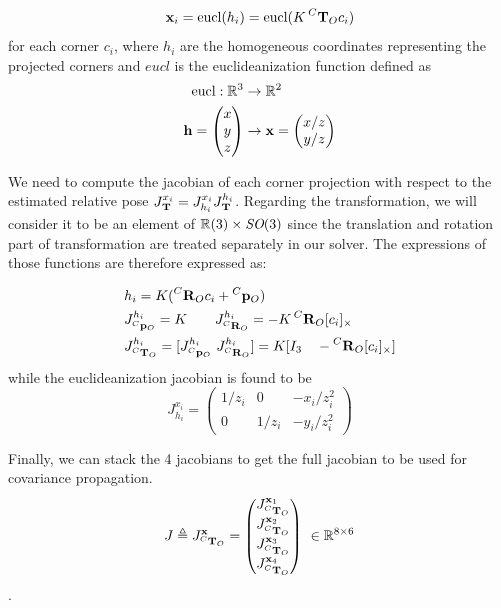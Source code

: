 \begin{equation}
    {\bf x}_i = \text{eucl}(h_i) = \text{eucl}(K\prescript{C}{}{{\bf T}}_{O} c_i)
\end{equation}
for each corner $c_i$, where $h_i$ are the homogeneous coordinates representing the projected corners and $eucl$ is the euclideanization function defined as
\begin{equation}
    \begin{split}
        \text{eucl}: \mathbb{R}^3 &\rightarrow \mathbb{R}^2 \\
        {\bf h} = \begin{pmatrix}x\\y\\z\end{pmatrix} &\rightarrow {\bf x} = \begin{pmatrix}x/z\\y/z\end{pmatrix}
    \end{split}
\end{equation}

We need to compute the jacobian of each corner projection with respect to the estimated relative pose $J^{x_i}_{\prescript{}{}{{\bf T}}_{}} = J^{x_i}_{h_i} J^{h_i}_{\prescript{}{}{{\bf T}}_{}}$. 
Regarding the transformation, we will consider it to be an element of $\mathbb{R}(3)\times \textit{SO}(3)$ since the translation and rotation part 
of transformation are treated separately in our solver. The expressions of those functions are therefore expressed as:

\begin{equation}
    \begin{split}
        &h_i = K(\prescript{C}{}{{\bf R}}_{O}c_i + \prescript{C}{}{{\bf p}}_{O}) \\
        &J^{h_i}_{\prescript{C}{}{{\bf p}}_{O}} = K ~~~~~~ J^{h_i}_{\prescript{C}{}{{\bf R}}_{O}} = -K\prescript{C}{}{{\bf R}}_{O}[c_i]_{\times}  \\  
        &J^{h_i}_{\prescript{C}{}{{\bf T}}_{O}} = [J^{h_i}_{\prescript{C}{}{{\bf p}}_{O}} ~J^{h_i}_{\prescript{C}{}{{\bf R}}_{O}}] = K [I_3 ~~~ -\prescript{C}{}{{\bf R}}_{O} [c_i]_{\times}]
    \end{split}
\end{equation}
while the euclideanization jacobian is found to be
\begin{equation}
    J^{x_i}_{h_i}
    =
    \begin{pmatrix}
    1/z_i & 0 & -x_i/z_i^2 \\
    0 & 1/z_i & -y_i/z_i^2
    \end{pmatrix}
\end{equation}


Finally, we can stack the 4 jacobians to get the full jacobian to be used for covariance propagation.
\begin{equation}
    J \triangleq J^{{\bf x}}_{\prescript{C}{}{{\bf T}}_{O}}=
    \begin{pmatrix}
    J^{{\bf x}_1}_{\prescript{C}{}{{\bf T}}_{O}} \\ J^{{\bf x}_2}_{\prescript{C}{}{{\bf T}}_{O}} \\ J^{{\bf x}_3}_{\prescript{C}{}{{\bf T}}_{O}} \\ J^{{\bf x}_4}_{\prescript{C}{}{{\bf T}}_{O}}
    \end{pmatrix}
    ~ \in \mathbb{R}^{8 \times 6}
\end{equation}.


